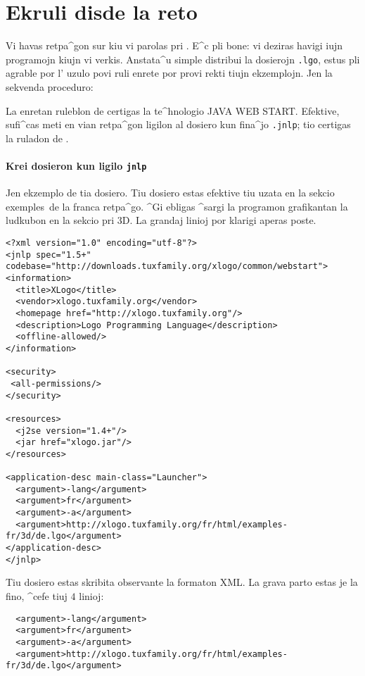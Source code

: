 \chapter{Ekruli \xlogo{} disde la reto}

Vi havas retpa^gon sur kiu vi parolas pri \xlogo{}.  E^c pli bone: vi
deziras havigi iujn programojn kiujn vi verkis.  Anstata^u simple
distribui la dosierojn \texttt{.lgo}, estus pli agrable por l' uzulo
povi ruli \xlogo{} enrete por provi rekti tiujn ekzemplojn.  Jen la
sekvenda proceduro:

La enretan ruleblon de \xlogo{} certigas la te^hnologio \textsc{JAVA
  WEB START}.  Efektive, sufi^cas meti en vian retpa^gon ligilon al
dosiero kun fina^jo \texttt{.jnlp}; tio certigas la ruladon de
\xlogo{}.

\subsubsection*{Krei dosieron kun ligilo \texttt{jnlp}}

Jen ekzemplo de tia dosiero.  Tiu dosiero estas efektive tiu uzata en
la sekcio \og exemples\fg\ de la franca retpa^go.  ^Gi ebligas ^sargi
la programon grafikantan la ludkubon en la sekcio pri 3D.  La grandaj
linioj por klarigi aperas poste.

\begin{verbatim}
<?xml version="1.0" encoding="utf-8"?>
<jnlp spec="1.5+" codebase="http://downloads.tuxfamily.org/xlogo/common/webstart">
<information>
  <title>XLogo</title>
  <vendor>xlogo.tuxfamily.org</vendor>
  <homepage href="http://xlogo.tuxfamily.org"/>
  <description>Logo Programming Language</description>
  <offline-allowed/>
</information>

<security>
 <all-permissions/>
</security>

<resources>
  <j2se version="1.4+"/>
  <jar href="xlogo.jar"/>
</resources>

<application-desc main-class="Launcher">
  <argument>-lang</argument>
  <argument>fr</argument>
  <argument>-a</argument>
  <argument>http://xlogo.tuxfamily.org/fr/html/examples-fr/3d/de.lgo</argument>
</application-desc>
</jnlp>
\end{verbatim}

Tiu dosiero estas skribita observante la formaton XML.
La grava parto estas je la fino, ^cefe tiuj $4$ linioj:
\begin{verbatim}
  <argument>-lang</argument>
  <argument>fr</argument>
  <argument>-a</argument>
  <argument>http://xlogo.tuxfamily.org/fr/html/examples-fr/3d/de.lgo</argument>
\end{verbatim}

